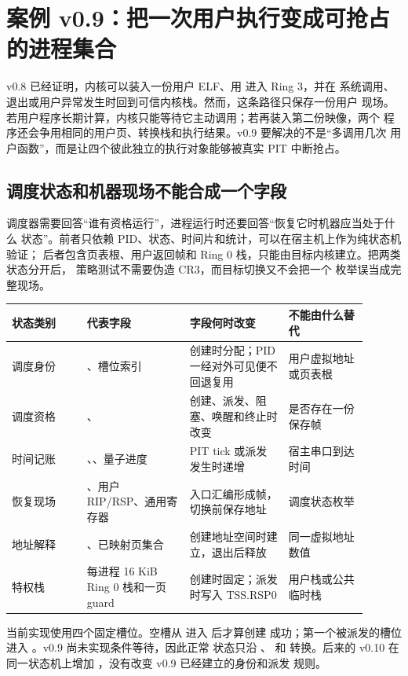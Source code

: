 \section{案例 v0.9：把一次用户执行变成可抢占的进程集合}

v0.8 已经证明，内核可以装入一份用户 ELF、用  进入 Ring 3，并在
系统调用、退出或用户异常发生时回到可信内核栈。然而，这条路径只保存一份用户
现场。若用户程序长期计算，内核只能等待它主动调用；若再装入第二份映像，两个
程序还会争用相同的用户页、转换栈和执行结果。v0.9 要解决的不是“多调用几次
用户函数”，而是让四个彼此独立的执行对象能够被真实 PIT 中断抢占。

\subsection{调度状态和机器现场不能合成一个字段}

调度器需要回答“谁有资格运行”，进程运行时还要回答“恢复它时机器应当处于什么
状态”。前者只依赖 PID、状态、时间片和统计，可以在宿主机上作为纯状态机验证；
后者包含页表根、用户返回帧和 Ring 0 栈，只能由目标内核建立。把两类状态分开后，
策略测试不需要伪造 CR3，而目标切换又不会把一个  枚举误当成完整现场。

\begin{longtable}{|L{0.19\linewidth}|L{0.26\linewidth}|L{0.25\linewidth}|L{0.20\linewidth}|}
\toprule
状态类别 & 代表字段 & 字段何时改变 & 不能由什么替代 \\
\midrule
调度身份 & 、槽位索引 & 创建时分配；PID 一经对外可见便不回退复用 & 用户虚拟地址或页表根 \\\tablerowrule
调度资格 & 、 & 创建、派发、阻塞、唤醒和终止时改变 & 是否存在一份保存帧 \\\tablerowrule
时间记账 & 、、量子进度 & PIT tick 或派发发生时递增 & 宿主串口到达时间 \\\tablerowrule
恢复现场 & 、用户 RIP/RSP、通用寄存器 & 入口汇编形成帧，切换前保存地址 & 调度状态枚举 \\\tablerowrule
地址解释 & 、已映射页集合 & 创建地址空间时建立，退出后释放 & 同一虚拟地址数值 \\\tablerowrule
特权栈 & 每进程 16 KiB Ring 0 栈和一页 guard & 创建时固定；派发时写入 TSS.RSP0 & 用户栈或公共临时栈 \\
\bottomrule
\end{longtable}

当前实现使用四个固定槽位。空槽从  进入  后才算创建
成功；第一个被派发的槽位进入 。v0.9 尚未实现条件等待，因此正常
状态只沿 、 和  转换。后来的
v0.10 在同一状态机上增加 ，没有改变 v0.9 已经建立的身份和派发
规则。

